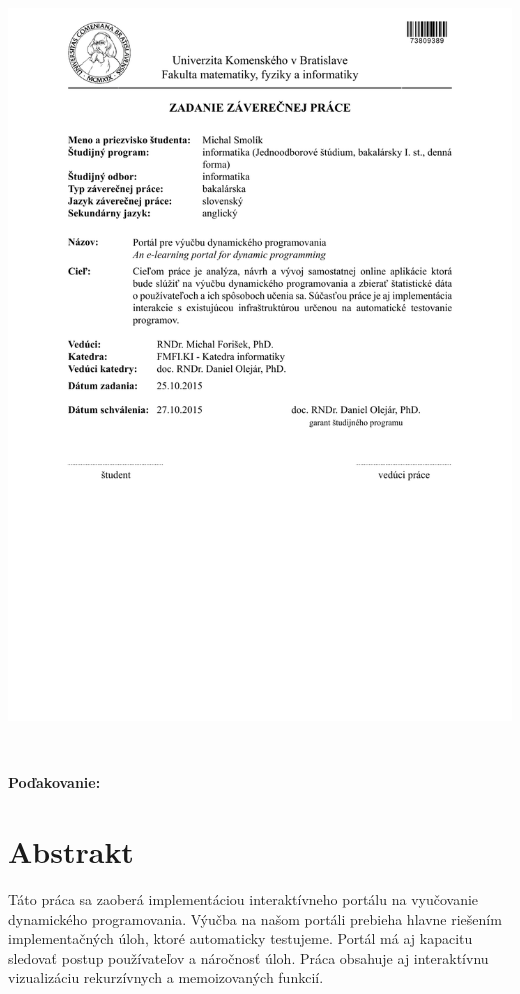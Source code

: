 \documentclass[12pt, oneside]{book}
\begin{document}
\newpage
\thispagestyle{empty}
\centerline{\includegraphics[width=\paperwidth]{images/zadanie}}


\frontmatter

\setcounter{page}{3}
\newpage
~

\vfill
{\bf Poďakovanie:}


\newpage
\section*{Abstrakt}
Táto práca sa zaoberá implementáciou interaktívneho portálu na vyučovanie
dynamického programovania. Výučba na našom portáli prebieha hlavne riešením
implementačných úloh, ktoré automaticky testujeme. Portál má aj kapacitu
sledovať postup používateľov a náročnosť úloh. Práca obsahuje aj
interaktívnu vizualizáciu rekurzívnych a memoizovaných funkcií.
\end{document}
